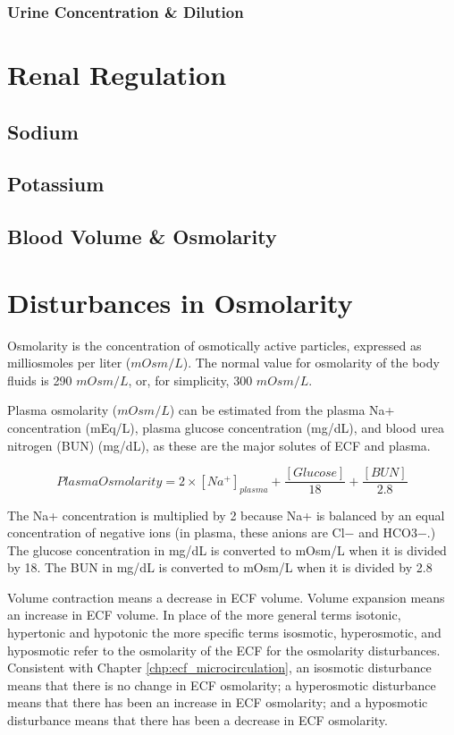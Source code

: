 \subsubsection{Urine Concentration \& Dilution}


\section{Renal Regulation}

\subsection{Sodium}

\subsection{Potassium}

\subsection{Blood Volume \& Osmolarity}


\section{Disturbances in Osmolarity}

Osmolarity is the concentration of osmotically active particles, expressed as milliosmoles per liter ($mOsm/L$). The normal value for osmolarity of the body fluids is 290 $mOsm/L$, or, for simplicity, 300 $mOsm/L$.

Plasma osmolarity ($mOsm/L$) can be estimated from the plasma Na+ concentration (mEq/L), plasma glucose concentration (mg/dL), and blood urea nitrogen (BUN) (mg/dL), as these are the major solutes of ECF and plasma. 

\begin{equation}

Plasma Osmolarity = 2 \times [Na^+]_{plasma} + \frac{[Glucose]}{18} +\frac{[BUN]}{2.8}
\label{osmolarity}
\end{equation}

The Na+ concentration is multiplied by 2 because Na+ is balanced by an equal concentration of negative ions (in plasma, these anions are Cl− and HCO3−.) The glucose concentration in mg/dL is converted to mOsm/L when it is divided by 18. The BUN in mg/dL is converted to mOsm/L when it is divided by 2.8

Volume contraction means a decrease in ECF volume. Volume expansion means an increase in ECF volume. In place of the more general terms isotonic, hypertonic and hypotonic the more specific terms isosmotic, hyperosmotic, and hyposmotic refer to the osmolarity of the ECF for the osmolarity disturbances. Consistent with Chapter \ref{chp:ecf_microcirculation}, an isosmotic disturbance means that there is no change in ECF osmolarity; a hyperosmotic disturbance means that there has been an increase in ECF osmolarity; and a hyposmotic disturbance means that there has been a decrease in ECF osmolarity. 


